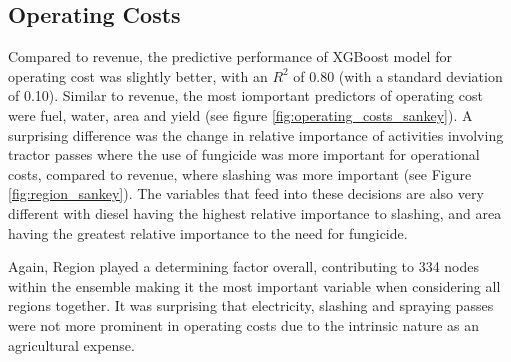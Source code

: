 \documentclass[review,12pt,authoryear]{elsarticle}
\begin{document}
\begin{linenumbers}
\subsection{Operating Costs}


Compared to revenue, the predictive performance of XGBoost model for operating cost was slightly better, with an $R^2$ of 0.80 (with a standard deviation of 0.10). Similar to revenue, the most iomportant predictors of operating cost were fuel, water, area and yield (see figure \ref{fig:operating_costs_sankey}). A surprising difference was the change in relative importance of activities involving tractor passes where the use of fungicide was more important for operational costs, compared to revenue, where slashing was more important (see Figure \ref{fig:region_sankey}). The variables that feed into these decisions are also very different with diesel having the highest relative importance to slashing, and area having the greatest relative importance to the need for fungicide.
\par
Again, Region played a determining factor overall, contributing to 334 nodes within the ensemble making it the most important variable when considering all regions together. It was surprising that electricity, slashing and spraying passes were not more prominent in operating costs due to the intrinsic nature as an agricultural expense.
\par
\begin{figure}[htb]

\end{figure}
\end{linenumbers}
\end{document}
